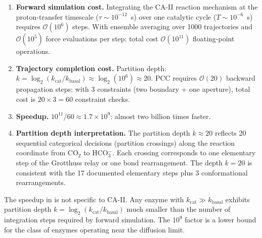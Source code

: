 \begin{example}
\label{ex:ca2}
\begin{enumerate}[label=(\roman*), itemsep=4pt]
    \item \textbf{Forward simulation cost.}  Integrating the CA-II reaction
          mechanism at the proton-transfer timescale ($\tau \sim 10^{-12}$~s)
          over one catalytic cycle ($T \sim 10^{-6}$~s) requires
          $\mathcal{O}(10^6)$ steps.  With ensemble averaging over 1000
          trajectories and $\mathcal{O}(10^5)$ force evaluations per step:
          total cost $\mathcal{O}(10^{11})$ floating-point operations.

    \item \textbf{Trajectory completion cost.}  Partition depth:
          $k = \log_2(k_\mathrm{cat}/k_\mathrm{basal}) \approx \log_2(10^6)
          \approx 20$.  PCC requires $\mathcal{O}(20)$ backward propagation
          steps; with 3 constraints (two boundary + one aperture), total cost
          is $20 \times 3 = 60$ constraint checks.

    \item \textbf{Speedup.}  $10^{11}/60 \approx 1.7 \times 10^9$: almost
          two billion times faster.

    \item \textbf{Partition depth interpretation.}  The partition depth
          $k \approx 20$ reflects 20 sequential categorical decisions
          (partition crossings) along the reaction coordinate from CO$_2$
          to HCO$_3^-$.  Each crossing corresponds to one elementary step of
          the Grotthuss relay or one bond rearrangement.  The depth $k = 20$
          is consistent with the 17 documented elementary steps plus 3
          conformational rearrangements.
\end{enumerate}
\end{example}

\begin{remark}
The speedup in  is not specific to CA-II.  Any enzyme with
$k_\mathrm{cat} \gg k_\mathrm{basal}$ exhibits partition depth
$k = \log_2(k_\mathrm{cat}/k_\mathrm{basal})$ much smaller than the number
of integration steps required by forward simulation.  The $10^9$ factor is
a lower bound for the class of enzymes operating near the diffusion limit.
\end{remark}

